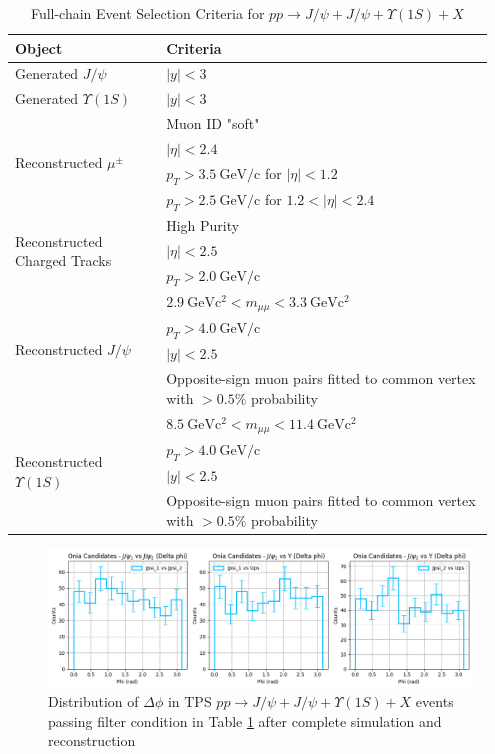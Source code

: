 \documentclass[10pt,twocolumn]{article}
\newcommand*{\GeVc}{~\text{GeV/c}}
\newcommand*{\GeVcs}{~\text{GeV}\text{c}^2}
\begin{document}
\begin{table}[h!]
    \centering
    \caption{Full-chain Event Selection Criteria for $pp\to J/\psi+J/\psi+\Upsilon(1S)+X$\\}
    \begin{tabular}{p{0.3\linewidth} p{0.65\linewidth}}
        \toprule
        \textbf{Object} & \textbf{Criteria} \\
        \midrule
        Generated $J/\psi $         & $\left|y\right|<3$ \\
        Generated $\Upsilon(1S)$    & $\left|y\right|<3$ \\
        \midrule
        \multirow[t]{4}{=}{Reconstructed $\mu^\pm $} & Muon ID "soft" \\
                & $|\eta| < 2.4$ \\
                & $p_T > 3.5\GeVc$ for $|\eta| < 1.2$ \\
                & $p_T > 2.5\GeVc$ for $1.2 < |\eta| < 2.4$ \\
        \multirow[t]{3}{=}{Reconstructed Charged Tracks} & High Purity \\
                  & $|\eta|<2.5$ \\
                  & $p_T > 2.0 \GeVc$ \\
        \midrule
        \multirow[t]{4}{=}{Reconstructed $J/\psi$} & $2.9 \GeVcs < m_{\mu\mu} < 3.3 \GeVcs$ \\
                & $p_T > 4.0\GeVc$ \\
                & $|y| < 2.5$ \\
                & Opposite-sign muon pairs fitted to common vertex with $> 0.5\%$ probability \\
        \midrule
        \multirow[t]{4}{=}{Reconstructed $\Upsilon(1S)$} & $8.5\GeVcs < m_{\mu\mu} < 11.4 \GeVcs$ \\
                & $p_T > 4.0\GeVc$ \\
                & $|y| < 2.5$ \\
                & Opposite-sign muon pairs fitted to common vertex with $> 0.5\%$ probability \\
        \midrule
    \end{tabular}
    \label{tab:JpsiJpsiY_MC_Full_Filter}
\end{table}

\begin{figure}[!htbp]
    \centering
    \includegraphics[width=1.0\linewidth]{images/Ntuple_LEVEL_TPS_DeltaPhi_filtered.png}
    \caption{Distribution of $\Delta \phi$ in TPS $pp\to J/\psi+J/\psi+\Upsilon(1S)+X$ events passing filter condition in Table \ref{tab:JpsiJpsiY_MC_Full_Filter} after complete simulation and reconstruction}
    \label{fig:TPS_JJY1S_filtered_DeltaPhi_Ntuple}
\end{figure}
\end{document}
